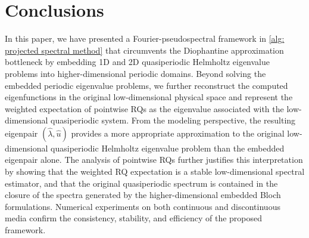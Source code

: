 \documentclass[11pt]{article}
\numberwithin{equation}{section}
\begin{document}
\section{Conclusions}
In this paper, we have presented a Fourier-pseudospectral framework in \cref{alg: projected spectral method} that circumvents the Diophantine approximation bottleneck by embedding 1D and 2D quasiperiodic Helmholtz eigenvalue problems into higher-dimensional periodic domains. Beyond solving the embedded periodic eigenvalue problems, we further reconstruct the computed eigenfunctions in the original low-dimensional physical space and represent the weighted expectation of pointwise RQs as the eigenvalue associated with the low-dimensional quasiperiodic system. From the modeling perspective, the resulting eigenpair $(\widehat{\lambda},\widehat u)$ provides a more appropriate approximation to the original low-dimensional quasiperiodic Helmholtz eigenvalue problem than the embedded eigenpair alone. The analysis of pointwise RQs further justifies this interpretation by showing that the weighted RQ expectation is a stable low-dimensional spectral estimator, and that the original quasiperiodic spectrum is contained in the closure of the spectra generated by the higher-dimensional embedded Bloch formulations. Numerical experiments on both continuous and discontinuous media confirm the consistency, stability, and efficiency of the proposed framework.








\end{document}
